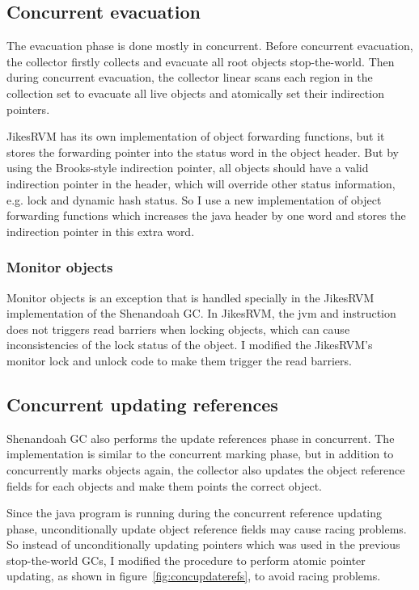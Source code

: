 \subsection{Concurrent evacuation}

The evacuation phase is done mostly in concurrent. Before concurrent evacuation,
the collector firstly collects and evacuate all root objects stop-the-world.
Then during concurrent evacuation, the collector linear scans each region in the
collection set to evacuate all live objects and atomically set their indirection
pointers.

JikesRVM has its own implementation of object forwarding functions, but it stores the forwarding
pointer into the status word in the object header. But by using the Brooks-style indirection
pointer, all objects should have a valid indirection pointer in the header, which will override other status
information, e.g. lock and dynamic hash status. So I use a new implementation of
object forwarding functions which increases the java header by one word and stores the indirection
pointer in this extra word.

\subsubsection{Monitor objects}

Monitor objects is an exception that is handled specially in the JikesRVM implementation of the Shenandoah GC.
In JikesRVM, the jvm  and  instruction
does not triggers read barriers when locking objects, which can cause inconsistencies 
of the lock status of the object. I modified the JikesRVM's monitor lock and unlock
code to make them trigger the read barriers.

\subsection{Concurrent updating references}

Shenandoah GC also performs the update references phase in concurrent.
The implementation is similar to the concurrent marking phase, but in addition to
concurrently marks objects again, the collector also updates the object reference fields
for each objects and make them points the correct object.

Since the java program is running during the concurrent reference updating phase,
unconditionally update object reference fields may cause racing problems. So instead of
unconditionally updating pointers which was used in the previous stop-the-world GCs,
I modified the procedure to perform
atomic pointer updating, as shown in figure~\ref{fig:concupdaterefs},
to avoid racing problems.

